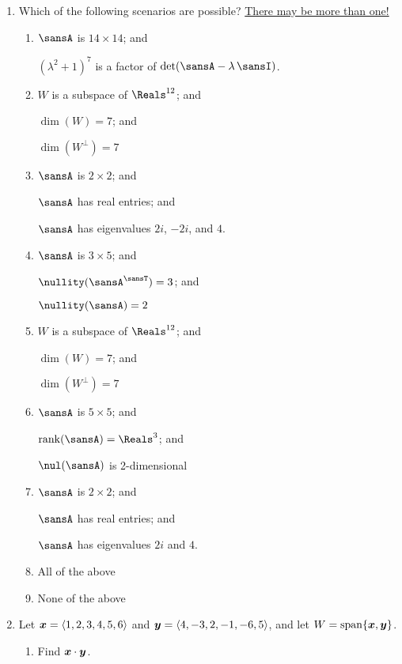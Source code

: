 \documentclass[12pt]{article}
\begin{document}
	\begin{enumerate}[topsep=0.125in, itemsep=0.5in]
		\item Which of the following scenarios are possible? \ul{There may be more than one!}
		\begin{multicols}{2}
			\begin{enumerate}[itemsep=0.375in,leftmargin=0.5in,rightmargin=0.25in,label=(\roman*).]
				\item $\sansA$ is $14\times14$; and\par $(\lambda^2+1)^7$ is a factor of $\det(\sansA-\lambda\,\sansI)$.							%
				\item $W$ is a subspace of $\Reals^{12}$; and\par $\dim(W)=7$; and\par $\dim(W^\perp)=7$											%
				\item $\sansA$ is $2\times 2$; and\par $\sansA$ has real entries; and\par $\sansA$ has eigenvalues $2i$, $-2i$, and $4$.			%
				\item $\sansA$ is $3\times 5$; and\par $\nullity(\sansA^\sansT)=3$; and\par $\nullity(\sansA)=2$									%
				\item $W$ is a subspace of $\Reals^{12}$; and\par $\dim(W)=7$; and\par $\dim(W^\perp)=7$											%
				\item $\sansA$ is $5\times 5$; and\par $\rank(\sansA)=\Reals^3$; and\par $\nul(\sansA)$ is 2-dimensional							%
				\item $\sansA$ is $2\times 2$; and\par $\sansA$ has real entries; and\par $\sansA$ has eigenvalues $2i$ and $4$.					%
				\item All of the above
				\item None of the above
			\end{enumerate}
		\end{multicols}
		
		\item Let $\boldsymbol{x}=\langle 1,2,3,4,5,6\rangle$ and $\boldsymbol{y}=\langle 4,-3,2,-1,-6,5\rangle$, and let $W=\operatorname{span}\{\boldsymbol{x},\boldsymbol{y}\}$.
		\begin{enumerate}[itemsep=0.25in]
			\item Find $\boldsymbol{x}\cdot\boldsymbol{y}$.
			

\end{enumerate}
\end{enumerate}
\end{document}
